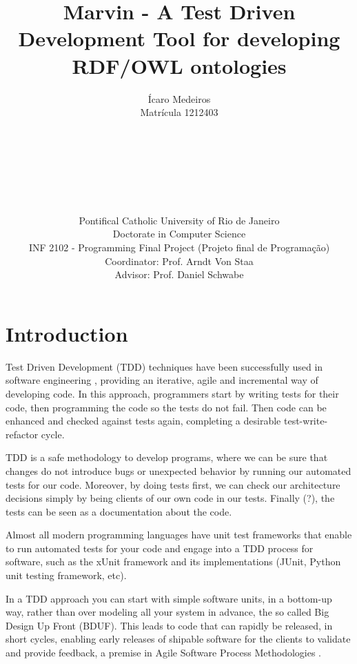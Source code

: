 \documentclass{report}
\begin{document}
\title{Marvin - A Test Driven Development Tool for developing RDF/OWL ontologies}
\author{
Ícaro Medeiros\\
Matrícula 1212403
\\ \\ \\ \\ \\ \\ \\ \\
Pontifical Catholic University of Rio de Janeiro \\
Doctorate in Computer Science \\
INF 2102 - Programming Final Project (Projeto final de Programação) \\
Coordinator: Prof. Arndt Von Staa \\
Advisor: Prof. Daniel Schwabe
}

\maketitle
\tableofcontents

\chapter{Introduction}

Test Driven Development (TDD) techniques have been successfully used in
software engineering \cite{beck03}, providing an iterative, agile and incremental way of developing
code. In this approach, programmers start by writing tests for their code, then programming the code
so the tests do not fail. Then code can be enhanced and checked against tests again, completing a desirable
test-write-refactor cycle.

TDD is a safe methodology to develop programs, where we can be sure that changes do not
introduce bugs or unexpected behavior by running our automated tests for our code. Moreover,
by doing tests first, we can check our architecture decisions simply by being clients of our own code
in our tests. Finally (?), the tests can be seen as a documentation about the code.

Almost all modern programming languages have unit test frameworks that enable to run
automated tests for your code and engage into a TDD process for software, such as the xUnit
framework \cite{beck03} and its implementations (JUnit, Python unit testing framework, etc).

In a TDD approach you can start with simple software units, in a bottom-up way,
rather than over modeling all your system in advance, the so called Big Design Up Front (BDUF).
This leads to code that can rapidly be released, in short cycles, enabling early releases of
shipable software for the clients to validate and provide feedback, a premise in Agile
Software Process Methodologies \cite{beck01, beck04, martin03}.
\end{document}
